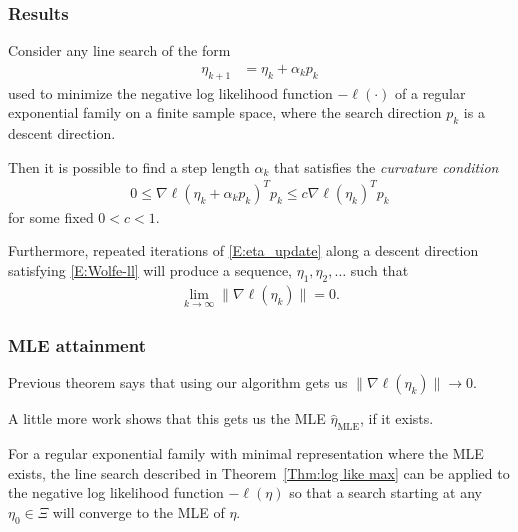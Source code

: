 \documentclass[ 10pt]{beamer}
\newcommand{\etaMLE}{\hat{\eta}_{\textrm{MLE}}}
\begin{document}
\frame
{
\frametitle{Results}
{\small
\begin{theorem} \label{Thm:log like max}
Consider any line search of the form 
\begin{align}
	\eta_{k+1} &= \eta_k + \alpha_k p_k \label{E:eta_update}
\end{align}
used to minimize the negative log likelihood function $-\ell(\cdot)$ of a regular 
exponential family on a finite sample space, where the search direction $p_k$ 
is a descent direction.

Then it is possible to find a step length $\alpha_k$ 
that satisfies the \emph{curvature condition}
\begin{align}
	0 \leq \nabla \ell( \eta_k + \alpha_k p_k)^T p_k  \leq c \nabla \ell(\eta_k)^T p_k  
\label{E:Wolfe-ll}
\end{align}
for some fixed $0 < c < 1$.

Furthermore, repeated iterations of \eqref{E:eta_update} along a descent direction 
satisfying \eqref{E:Wolfe-ll} will produce a sequence, $\eta_1, \eta_2, \ldots$ such 
that
\begin{align*}
	\lim_{k \to \infty} \lVert \nabla \ell(\eta_k) \rVert = 0.
\end{align*}
\end{theorem}
}
}

\frame
{
\frametitle{MLE attainment}
Previous theorem says that using our algorithm gets us 
$\lVert \nabla \ell(\eta_k) \rVert \to 0$.  
\vspace{2mm}

A little more work shows that this gets us the MLE $\etaMLE$, if it exists.
\vspace{2mm}

\begin{theorem} \label{Thm:Line Search works}
For a regular exponential family with minimal representation where the MLE exists, the 
line search described in 
Theorem~\ref{Thm:log like max} can be applied to the negative log likelihood function 
$-\ell(\eta)$ so that a search 
starting at any $\eta_0 \in \Xi$ will converge to the MLE of $\eta$.
\end{theorem}

}
\end{document}
